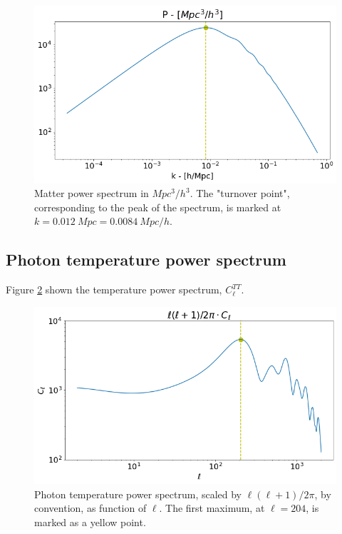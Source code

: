 \documentclass[10pt, a4paper]{article}
\begin{document}
\begin{figure}[h!]
    \centering
    \includegraphics[scale=0.5]{../m4_figs/MatterPower.png}
    \caption{Matter power spectrum in $Mpc^3/h^3$. The "turnover point", corresponding to the peak of the spectrum, is marked at $k=\SI{0.012}{Mpc} = \SI{0.0084}{Mpc/h}$.}
    \label{fig:MatterPower}
\end{figure}



\subsection{Photon temperature power spectrum}
Figure \ref{fig:Cell} shown the temperature power spectrum, $C_\ell^{TT}$. 

\begin{figure}[h!]
    \centering
    \includegraphics[scale=0.5]{../m4_figs/Cell.png}
    \caption{Photon temperature power spectrum, scaled by $\ell(\ell+1)/2\pi$, by convention, as function of $\ell$. The first maximum, at $\ell = 204$, is marked as a yellow point.}
    \label{fig:Cell}
\end{figure}
\end{document}
